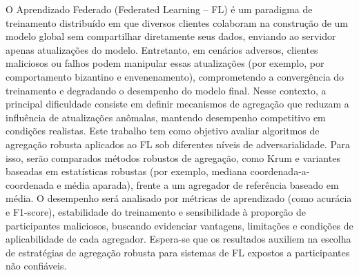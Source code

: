 O Aprendizado Federado (Federated Learning -- FL) é um paradigma de treinamento distribuído em que diversos clientes colaboram na construção de um modelo global sem compartilhar diretamente seus dados, enviando ao servidor apenas atualizações do modelo. Entretanto, em cenários adversos, clientes maliciosos ou falhos podem manipular essas atualizações (por exemplo, por comportamento bizantino e envenenamento), comprometendo a convergência do treinamento e degradando o desempenho do modelo final. Nesse contexto, a principal dificuldade consiste em definir mecanismos de agregação que reduzam a influência de atualizações anômalas, mantendo desempenho competitivo em condições realistas. Este trabalho tem como objetivo avaliar algoritmos de agregação robusta aplicados ao FL sob diferentes níveis de adversarialidade. Para isso, serão comparados métodos robustos de agregação, como Krum e variantes baseadas em estatísticas robustas (por exemplo, mediana coordenada-a-coordenada e média aparada), frente a um agregador de referência baseado em média. O desempenho será analisado por métricas de aprendizado (como acurácia e F1-score), estabilidade do treinamento e sensibilidade à proporção de participantes maliciosos, buscando evidenciar vantagens, limitações e condições de aplicabilidade de cada agregador. Espera-se que os resultados auxiliem na escolha de estratégias de agregação robusta para sistemas de FL expostos a participantes não confiáveis.





